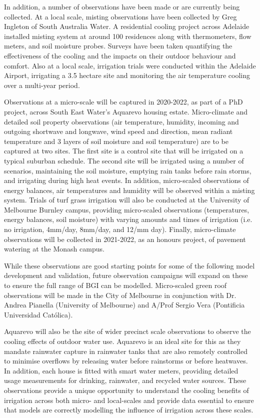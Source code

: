 In addition, a number of observations have been made or are currently being collected. At a local scale, misting observations have been collected by Greg Ingleton of South Australia Water. A residential cooling project across Adelaide installed misting system at around 100 residences along with thermometers, flow meters, and soil moisture probes. Surveys have been taken quantifying the effectiveness of the cooling and the impacts on their outdoor behaviour and comfort. Also at a local scale, irrigation trials were conducted within the Adelaide Airport, irrigating a 3.5 hectare site and monitoring the air temperature cooling over a multi-year period\cite{CRCWCS2018,Ingleton2020,Qian2020}. 

Observations at a micro-scale will be captured in 2020-2022, as part of a PhD project, across South East Water's Aquarevo housing estate. Micro-climate and detailed soil property observations (air temperature, humidity, incoming and outgoing shortwave and longwave, wind speed and direction, mean radiant temperature and 3 layers of soil moisture and soil temperature) are  to be captured at two sites. The first site is a control site that will be irrigated on a typical suburban schedule. The second site will be irrigated using a number of scenarios, maintaining the soil moisture, emptying rain tanks before rain storms, and irrigating during high heat events. In addition, micro-scaled observations of energy balances, air temperatures and humidity will be observed within a misting system. Trials of turf grass irrigation will also be conducted at the University of Melbourne Burnley campus, providing micro-scaled observations (temperatures, energy balances, soil moisture) with varying amounts and times of irrigation (i.e. no irrigation, 4mm/day, 8mm/day, and 12/mm day). Finally, micro-climate observations will be collected in 2021-2022, as an honours project, of pavement watering at the Monash campus.

While these observations are good starting points for some of the following model development and validation, future observation campaigns will expand on these to ensure the full range of BGI can be modelled. Micro-scaled green roof observations will be made in the City of Melbourne in conjunction with Dr. Andrea Pianella (University of Melbourne) and A/Prof Sergio Vera (Pontificia Universidad Cat\'{o}lica). 

Aquarevo will also be the site of wider precinct scale observations to observe the cooling effects of outdoor water use. Aquarevo is an ideal site for this as they mandate rainwater capture in rainwater tanks that are also remotely controlled to minimise overflows by releasing water before rainstorms or before heatwaves. In addition, each house is fitted with smart water meters, providing detailed usage measurements for drinking, rainwater, and recycled water sources. These observations provide a unique opportunity to understand the cooling benefits of irrigation across both micro- and local-scales and provide data essential to ensure that models are correctly modelling the influence of irrigation across these scales. 

